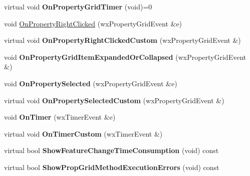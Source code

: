 \begin{DoxyCompactItemize}
\item 
\hypertarget{class_prop_grid_frame_base_adc06bb8757171b10d9a84b3b3c8b33ea}{virtual void {\bfseries On\+Property\+Grid\+Timer} (void)=0}\label{class_prop_grid_frame_base_adc06bb8757171b10d9a84b3b3c8b33ea}

\item 
void \hyperlink{class_prop_grid_frame_base_a0afb2cdd3da1a2844d2c3a89ef6be719}{On\+Property\+Right\+Clicked} (wx\+Property\+Grid\+Event \&e)
\item 
\hypertarget{class_prop_grid_frame_base_a7dbb6bf7e62cd77814efdcd327fd57ef}{virtual void {\bfseries On\+Property\+Right\+Clicked\+Custom} (wx\+Property\+Grid\+Event \&)}\label{class_prop_grid_frame_base_a7dbb6bf7e62cd77814efdcd327fd57ef}

\item 
\hypertarget{class_prop_grid_frame_base_a58e5c4a2684721fe11ebc1f7802aa850}{void {\bfseries On\+Property\+Grid\+Item\+Expanded\+Or\+Collapsed} (wx\+Property\+Grid\+Event \&)}\label{class_prop_grid_frame_base_a58e5c4a2684721fe11ebc1f7802aa850}

\item 
\hypertarget{class_prop_grid_frame_base_ac01aa2a2348a0bfb1bf99a42700b38bb}{void {\bfseries On\+Property\+Selected} (wx\+Property\+Grid\+Event \&e)}\label{class_prop_grid_frame_base_ac01aa2a2348a0bfb1bf99a42700b38bb}

\item 
\hypertarget{class_prop_grid_frame_base_a45df272ce484b18160a7089070925077}{virtual void {\bfseries On\+Property\+Selected\+Custom} (wx\+Property\+Grid\+Event \&)}\label{class_prop_grid_frame_base_a45df272ce484b18160a7089070925077}

\item 
\hypertarget{class_prop_grid_frame_base_a5fafdb9b7eeb935faadaed67dd334086}{void {\bfseries On\+Timer} (wx\+Timer\+Event \&e)}\label{class_prop_grid_frame_base_a5fafdb9b7eeb935faadaed67dd334086}

\item 
\hypertarget{class_prop_grid_frame_base_aecef3e9b2ee2848c35c5c0a6f2ea2ac4}{virtual void {\bfseries On\+Timer\+Custom} (wx\+Timer\+Event \&)}\label{class_prop_grid_frame_base_aecef3e9b2ee2848c35c5c0a6f2ea2ac4}

\item 
\hypertarget{class_prop_grid_frame_base_a58f217246deae675e325674fae8876ab}{virtual bool {\bfseries Show\+Feature\+Change\+Time\+Consumption} (void) const }\label{class_prop_grid_frame_base_a58f217246deae675e325674fae8876ab}

\item 
\hypertarget{class_prop_grid_frame_base_a22ebb4aba08f7831e649ac5629d2026c}{virtual bool {\bfseries Show\+Prop\+Grid\+Method\+Execution\+Errors} (void) const }\label{class_prop_grid_frame_base_a22ebb4aba08f7831e649ac5629d2026c}

\end{DoxyCompactItemize}

